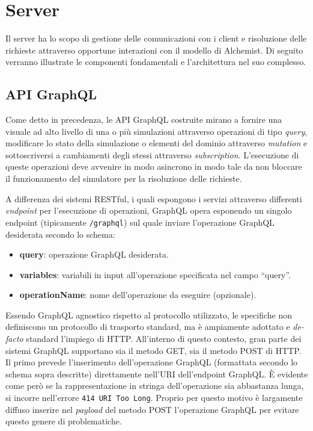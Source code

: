 \section{Server}\label{sec:server}
Il server ha lo scopo di gestione delle comunicazioni con i client e risoluzione delle richieste attraverso opportune interazioni con il modello
di Alchemist. Di seguito verranno illustrate le componenti fondamentali e l'architettura nel suo complesso.
%
\subsection{API GraphQL}\label{ssec:server-gql-apis}
Come detto in precedenza, le API GraphQL costruite mirano a fornire una visuale ad alto livello di una o più simulazioni attraverso operazioni di tipo \textit{query},
modificare lo stato della simulazione o elementi del dominio attraverso \textit{mutation} e sottoscriversi a cambiamenti degli stessi attraverso \textit{subscription}.
L'esecuzione di queste operazioni deve avvenire in modo asincrono in modo tale da non bloccare il funzionamento del simulatore per la risoluzione delle richieste.

A differenza dei sistemi \ac{REST}ful, i quali espongono i servizi attraverso differenti \textit{endpoint} per l'esecuzione di operazioni, GraphQL opera esponendo un
singolo endpoint (tipicamente \texttt{/graphql}) sul quale inviare l'operazione GraphQL desiderata secondo lo schema:
\begin{itemize}
    \item \textbf{query}: operazione GraphQL desiderata.
    \item \textbf{variables}: variabili in input all'operazione specificata nel campo ``query''.
    \item \textbf{operationName}: nome dell'operazione da eseguire (opzionale).
\end{itemize}
Essendo GraphQL agnostico rispetto al protocollo utilizzato, le specifiche non definiscono un protocollo di trasporto standard, ma è ampiamente adottato
e \textit{de-facto} standard l'impiego di HTTP.
All'interno di questo contesto, gran parte dei sistemi GraphQL supportano sia il metodo GET, sia il metodo POST di HTTP. Il primo prevede l'inserimento
dell'operazione GraphQL (formattata secondo lo schema sopra descritte) direttamente nell'URI dell'endpoint GraphQL. È evidente come però se la rappresentazione
in stringa dell'operazione sia abbastanza lunga, si incorre nell'errore \texttt{414 URI Too Long}. Proprio per questo motivo è largamente diffuso inserire
nel \textit{payload} del metodo POST l'operazione GraphQL per evitare questo genere di problematiche.


